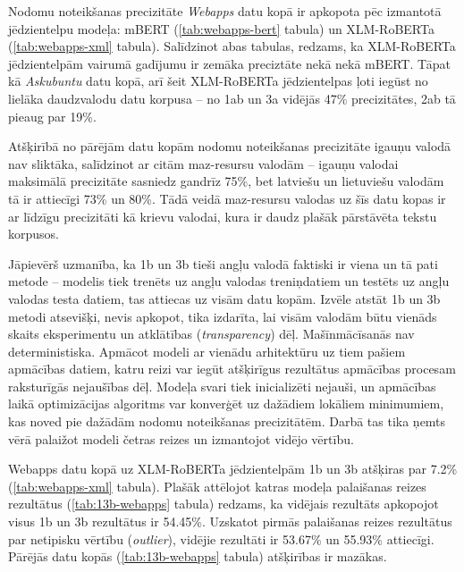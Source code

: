 

Nodomu noteikšanas precizitāte \textit{Webapps} datu kopā ir apkopota pēc izmantotā jēdzientelpu modeļa: mBERT (\ref{tab:webapps-bert} tabula) un XLM-RoBERTa (\ref{tab:webapps-xml} tabula). Salīdzinot abas tabulas, redzams, ka XLM-RoBERTa jēdzientelpām vairumā gadījumu ir zemāka preciztāte nekā nekā mBERT. Tāpat kā \textit{Askubuntu} datu kopā, arī šeit XLM-RoBERTa jēdzientelpas ļoti iegūst no lielāka daudzvalodu datu korpusa -- no 1ab un 3a vidējās 47\% precizitātes, 2ab tā pieaug par 19\%. 



Atšķirībā no pārējām datu kopām nodomu noteikšanas precizitāte igauņu valodā nav sliktāka, salīdzinot ar citām maz-resursu valodām -- igauņu valodai maksimālā precizitāte sasniedz gandrīz 75\%, bet latviešu un lietuviešu valodām tā ir attiecīgi 73\% un 80\%. Tādā veidā maz-resursu valodas uz šīs datu kopas ir ar līdzīgu precizitāti kā krievu valodai, kura ir daudz plašāk pārstāvēta tekstu korpusos.

Jāpievērš uzmanība, ka 1b un 3b tieši angļu valodā faktiski ir viena un tā pati metode -- modelis tiek trenēts uz angļu valodas treniņdatiem un testēts uz angļu valodas testa datiem, tas attiecas uz visām datu kopām. Izvēle atstāt 1b un 3b metodi atsevišķi, nevis apkopot, tika izdarīta, lai visām valodām būtu vienāds skaits eksperimentu un atklātības (\textit{transparency}) dēļ. Mašīnmācīsanās nav deterministiska. Apmācot modeli ar vienādu arhitektūru uz tiem pašiem apmācības datiem, katru reizi var iegūt atšķirīgus rezultātus apmācības procesam raksturīgās nejaušības dēļ. Modeļa svari tiek inicializēti nejauši, un apmācības laikā optimizācijas algoritms var konverģēt uz dažādiem lokāliem minimumiem, kas noved pie dažādām nodomu noteikšanas precizitātēm. Darbā tas tika ņemts vērā palaižot modeli četras reizes un izmantojot vidējo vērtību.



Webapps datu kopā uz XLM-RoBERTa jēdzientelpām 1b un 3b atšķiras par 
7.2\% (\ref{tab:webapps-xml} tabula). Plašāk attēlojot katras modeļa palaišanas reizes rezultātus (\ref{tab:13b-webapps} tabula) redzams, ka vidējais rezultāts apkopojot visus 1b un 3b rezultātus ir 54.45\%. Uzskatot pirmās palaišanas reizes rezultātus par netipisku vērtību (\textit{outlier}), vidējie rezultāti ir 53.67\% un 55.93\% attiecīgi. Pārējās datu kopās (\ref{tab:13b-webapps} tabula) atšķirības ir mazākas.

